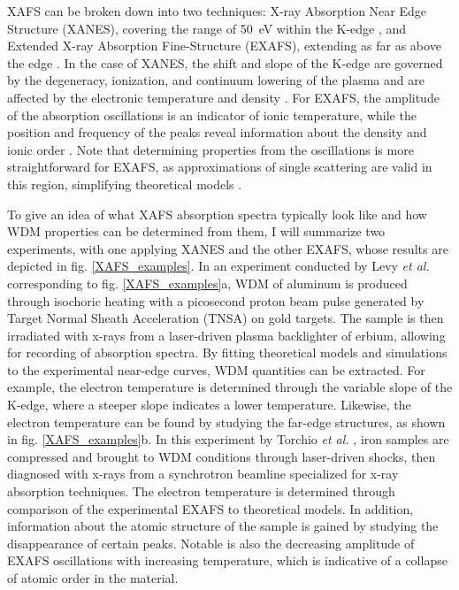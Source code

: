 XAFS can be broken 
down into two techniques: X-ray Absorption Near Edge 
Structure (XANES), covering the range of 
\SI{50}{\electronvolt} within the K-edge 
\citep{peyrusse2009k}, and Extended X-ray Absorption 
Fine-Structure (EXAFS), extending as far as  
above the edge \citep{fontaine1979soft}. In the case 
of XANES, 
the shift and slope of the K-edge are governed by the 
degeneracy, ionization, and continuum lowering of the 
plasma and are affected by the electronic temperature and 
density  \citep{falk2018experimental, levy2009x}. For EXAFS, the amplitude of the absorption 
oscillations is an indicator of ionic temperature, while 
the 
position and frequency of the peaks reveal 
information about the density and ionic order 
\cite{riley2021warm}. Note that determining 
properties from the oscillations is more 
straightforward for EXAFS, as approximations of 
single scattering are valid in this region, 
simplifying theoretical models 
\citep{newville2014fundamentals}.

To give an idea of what XAFS absorption spectra typically look like and 
how WDM properties can be determined from them, I will summarize two 
experiments, with one applying XANES and the other EXAFS, whose results are 
depicted in fig. 
\ref{XAFS_examples}. In an experiment conducted by Levy\textit{ et al.} 
\citep{levy2009x} corresponding 
to fig. \ref{XAFS_examples}a, WDM of aluminum is produced through isochoric 
heating with a picosecond proton beam pulse generated by Target Normal Sheath 
Acceleration (TNSA) on gold targets. The sample is then irradiated with x-rays 
from a laser-driven plasma backlighter of erbium, allowing for recording of 
absorption spectra. By fitting theoretical models and simulations to the 
experimental near-edge curves, WDM quantities can be extracted. For example, the electron 
temperature is determined through the variable slope of the K-edge, where a 
steeper slope indicates a lower temperature. Likewise, the electron temperature 
can be found by studying the far-edge structures, as shown in fig. 
\ref{XAFS_examples}b. In this experiment by Torchio \textit{et al.} 
\citep{torchio2016probing}, iron samples are compressed and brought to WDM 
conditions through laser-driven shocks, then diagnosed with x-rays from a synchrotron beamline specialized for x-ray absorption 
techniques. The electron temperature is determined through comparison of the experimental EXAFS to theoretical models. In addition, information about the atomic structure of the sample 
is gained by studying the disappearance of certain peaks. Notable is also the 
decreasing amplitude of EXAFS oscillations with increasing temperature, which is 
indicative of a collapse of atomic order in the material. 

